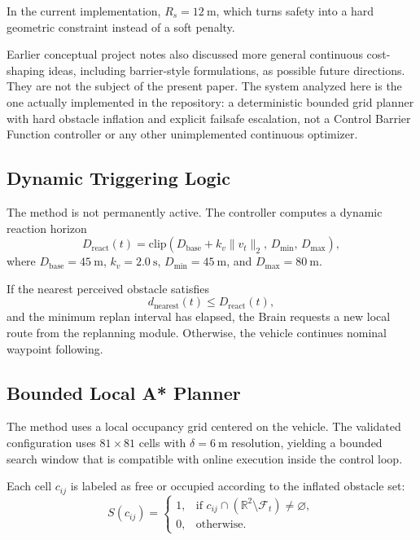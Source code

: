 \documentclass[a4paper,11pt]{article}
\begin{document}
In the current implementation, \(R_s = \SI{12}{\meter}\), which turns safety into a hard geometric constraint instead of a soft penalty.

Earlier conceptual project notes also discussed more general continuous cost-shaping ideas, including barrier-style formulations, as possible future directions. They are not the subject of the present paper. The system analyzed here is the one actually implemented in the repository: a deterministic bounded grid planner with hard obstacle inflation and explicit failsafe escalation, not a Control Barrier Function controller or any other unimplemented continuous optimizer.

\subsection{Dynamic Triggering Logic}

The method is not permanently active. The controller computes a dynamic reaction horizon
\begin{equation}
    D_{\mathrm{react}}(t) =
    \mathrm{clip}\!\left(D_{\mathrm{base}} + k_v \lVert v_t \rVert_2,\,
    D_{\min},\, D_{\max}\right),
\end{equation}
where \(D_{\mathrm{base}}=\SI{45}{\meter}\), \(k_v=\SI{2.0}{\second}\), \(D_{\min}=\SI{45}{\meter}\), and \(D_{\max}=\SI{80}{\meter}\).

If the nearest perceived obstacle satisfies
\begin{equation}
    d_{\mathrm{nearest}}(t) \le D_{\mathrm{react}}(t),
\end{equation}
and the minimum replan interval has elapsed, the Brain requests a new local route from the replanning module. Otherwise, the vehicle continues nominal waypoint following.

\subsection{Bounded Local A* Planner}

The method uses a local occupancy grid centered on the vehicle. The validated configuration uses \(81 \times 81\) cells with \(\delta=\SI{6}{\meter}\) resolution, yielding a bounded search window that is compatible with online execution inside the control loop.

Each cell \(c_{ij}\) is labeled as free or occupied according to the inflated obstacle set:
\begin{equation}
    S(c_{ij}) =
    \begin{cases}
        1, & \text{if } c_{ij} \cap \left(\mathbb{R}^2 \setminus \mathcal{F}_t\right) \neq \varnothing,\\
        0, & \text{otherwise.}
    \end{cases}
\end{equation}
\end{document}
